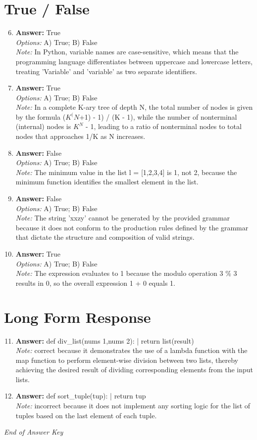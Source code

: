 \documentclass[12pt]{article}
\begin{document}
\section*{True / False}
\begin{enumerate}[label=\arabic*.]
\setcounter{enumi}{5}
\item \textbf{Answer:} True
\\ \textit{Options:} A) True; B) False
\\ \textit{Note:} In Python, variable names are case-sensitive, which means that the programming language differentiates between uppercase and lowercase letters, treating 'Variable' and 'variable' as two separate identifiers.
\item \textbf{Answer:} True
\\ \textit{Options:} A) True; B) False
\\ \textit{Note:} In a complete K-ary tree of depth N, the total number of nodes is given by the formula ($K^(N$+1) - 1) / (K - 1), while the number of nonterminal (internal) nodes is $K^N$ - 1, leading to a ratio of nonterminal nodes to total nodes that approaches 1/K as N increases.
\item \textbf{Answer:} False
\\ \textit{Options:} A) True; B) False
\\ \textit{Note:} The minimum value in the list l = [1,2,3,4] is 1, not 2, because the minimum function identifies the smallest element in the list.
\item \textbf{Answer:} False
\\ \textit{Options:} A) True; B) False
\\ \textit{Note:} The string 'xxzy' cannot be generated by the provided grammar because it does not conform to the production rules defined by the grammar that dictate the structure and composition of valid strings.
\item \textbf{Answer:} True
\\ \textit{Options:} A) True; B) False
\\ \textit{Note:} The expression evaluates to 1 because the modulo operation 3 \% 3 results in 0, so the overall expression 1 + 0 equals 1.
\end{enumerate}

\section*{Long Form Response}
\begin{enumerate}[label=\arabic*.]
\setcounter{enumi}{10}
\item \textbf{Answer:} def div\_list(nums 1,nums 2): | return list(result)
\\ \textit{Note:} correct because it demonstrates the use of a lambda function with the map function to perform element-wise division between two lists, thereby achieving the desired result of dividing corresponding elements from the input lists.
\item \textbf{Answer:} def sort\_tuple(tup): | return tup
\\ \textit{Note:} incorrect because it does not implement any sorting logic for the list of tuples based on the last element of each tuple.
\end{enumerate}

\vfill
\noindent\textit{End of Answer Key}
\end{document}
